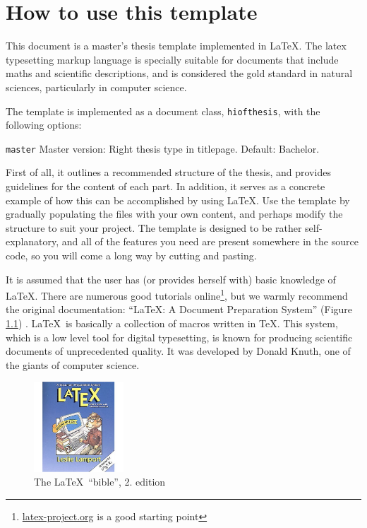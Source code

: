 \cleardoublepage
\chapter{How to use this template}
\label{chap:how-to} 

This document is a master's thesis template implemented in \LaTeX. 
The \gls{latex} typesetting markup language is specially suitable 
for documents that include \gls{maths} 
and scientific descriptions, and is considered the gold standard in natural sciences, particularly in computer science. 

The template is implemented as a document class, 
\texttt{hiofthesis}, with the following options:

\begin{compactdesc}
\item [\texttt{master}] Master version: Right thesis type in titlepage. Default: Bachelor.
\end{compactdesc}

First of all, it outlines a recommended structure of the thesis, and provides guidelines for the content of each part.
In addition, it serves as a concrete example of how this can be accomplished by using \LaTeX. Use the template by gradually populating the files with your own content, and perhaps modify the structure to suit your project. The template is designed to be rather self-explanatory, and all of the features you need are present somewhere in the source code, so you will come a long way by cutting and pasting.

It is assumed that the user has (or provides herself with) basic knowledge of \LaTeX. There are numerous good tutorials online\footnote{\url{latex-project.org} is a good starting point}, but we warmly recommend the original documentation: ``\LaTeX: A Document Preparation System'' (Figure \ref{fig:lamport}) \cite{lamport94ldp}. \LaTeX\ is basically a collection of macros written in \TeX.
This system, which is a low level tool for digital typesetting, is known for producing scientific documents of unprecedented quality. It was developed by Donald Knuth, one of the giants of computer science.

\begin{figure}[h]
\centering 
    \includegraphics[width=0.3\textwidth]{lamport}
    \caption{The \LaTeX\ ``bible'', 2. edition \label{fig:lamport}}
\end{figure}

